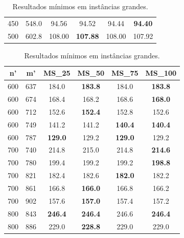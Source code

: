 \begin{table}[ht]
\begin{minipage}{0.45\textwidth}
\begin{tabular}{|c|c|c|c|c|c|}
        450 & 548.0 & 94.56 & 94.52 & 94.44 & \cellcolor{blue!20} \textbf{94.40} \\
        500 & 602.8 & 108.00 & \cellcolor{blue!20} \textbf{107.88} & 108.00 & 107.92 \\
        \hline
        \end{tabular}
    \caption*{\small Fonte: Produção do próprio autor.}
    \label{tab:construct-regressao-mediun}
\end{minipage}%
\hspace{0.05\textwidth} %
\begin{minipage}{0.45\textwidth}
    \centering
    \caption{\small Resultados mínimos em instâncias grandes.}
    \begin{tabular}{|c|c|c|c|c|c|}
        \hline
        \rowcolor{gray!30} \textbf{n'} & \textbf{m'} & \textbf{MS\_25} & \textbf{MS\_50} & \textbf{MS\_75} & \textbf{MS\_100} \\
        \hline
        600 & 637 & 184.0 & \cellcolor{blue!20} \textbf{183.8} & 184.0 & \cellcolor{blue!20} \textbf{183.8} \\
        600 & 674 & 168.4 & 168.2 & 168.6 & \cellcolor{blue!20} \textbf{168.0} \\
        600 & 712 & 152.6 & \cellcolor{blue!20} \textbf{152.4} & 152.8 & 152.6 \\
        600 & 749 & 141.2 & 141.2 & \cellcolor{blue!20} \textbf{140.4} & \cellcolor{blue!20} \textbf{140.4} \\
        600 & 787 & \cellcolor{blue!20} \textbf{129.0} & 129.2 & \cellcolor{blue!20} \textbf{129.0} & 129.2 \\
        700 & 740 & 214.8 & 215.0 & 214.8 & \cellcolor{blue!20} \textbf{214.6} \\
        700 & 780 & 199.4 & 199.2 & 199.2 & \cellcolor{blue!20} \textbf{198.8} \\
        700 & 821 & 182.4 & 182.6 & \cellcolor{blue!20} \textbf{182.0} & 182.2 \\
        700 & 861 & 166.8 & \cellcolor{blue!20} \textbf{166.0} & 166.8 & 166.2 \\
        700 & 902 & 157.6 & \cellcolor{blue!20} \textbf{157.0} & 157.4 & 157.2 \\
        800 & 843 & \cellcolor{blue!20} \textbf{246.4} & \cellcolor{blue!20} \textbf{246.4} & 246.6 & \cellcolor{blue!20} \textbf{246.4} \\
        800 & 886 & 229.0 & \cellcolor{blue!20} \textbf{228.8} & 229.0 & 229.0 \\

\end{tabular}
\end{minipage}
\end{table}
